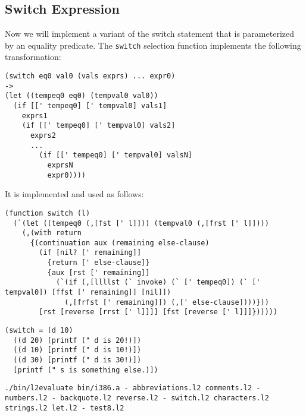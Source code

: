 \documentclass[twocolumn,landscape]{article}
\begin{document}
    \subsection{Switch Expression}\label{sec:switch-expression}
      Now we will implement a variant of the switch statement that is parameterized by an equality predicate. The \lstinline{switch} selection function implements the following transformation:
      \begin{lstlisting}
(switch eq0 val0 (vals exprs) ... expr0)
->
(let ((tempeq0 eq0) (tempval0 val0))
  (if [[' tempeq0] [' tempval0] vals1]
    exprs1
    (if [[' tempeq0] [' tempval0] vals2]
      exprs2
      ...
        (if [[' tempeq0] [' tempval0] valsN]
          exprsN
          expr0))))
      \end{lstlisting}
      It is implemented and used as follows:
      \begin{lstlisting}[caption={switch.l2}]
(function switch (l)
  (`(let ((tempeq0 (,[fst [' l]])) (tempval0 (,[frst [' l]])))
    (,(with return
      {(continuation aux (remaining else-clause)
        (if [nil? [' remaining]]
          {return [' else-clause]}
          {aux [rst [' remaining]]
            (`(if (,[llllst (` invoke) (` [' tempeq0]) (` [' tempval0]) [ffst [' remaining]] [nil]])
              (,[frfst [' remaining]]) (,[' else-clause])))}))
        [rst [reverse [rrst [' l]]]] [fst [reverse [' l]]]})))))
      \end{lstlisting}
      
      \begin{lstlisting}[caption={test8.l2}]
(switch = (d 10)
  ((d 20) [printf (" d is 20!)])
  ((d 10) [printf (" d is 10!)])
  ((d 30) [printf (" d is 30!)])
  [printf (" s is something else.)])
      \end{lstlisting}
      
      \begin{lstlisting}[caption={shell}]
./bin/l2evaluate bin/i386.a - abbreviations.l2 comments.l2 - numbers.l2 - backquote.l2 reverse.l2 - switch.l2 characters.l2 strings.l2 let.l2 - test8.l2
      \end{lstlisting}
\end{document}
